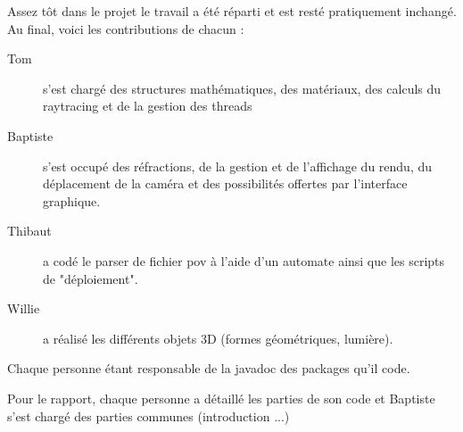 Assez tôt dans le projet le travail a été réparti et est resté pratiquement inchangé. Au final, voici les contributions de chacun :
\begin{description}
    \item [Tom] s'est chargé des structures mathématiques, des matériaux, des calculs du raytracing et de la gestion des threads
    \item [Baptiste] s'est occupé des réfractions, de la gestion et de l'affichage du rendu, du déplacement de la caméra et des possibilités offertes par l'interface graphique.
    \item [Thibaut] a codé le parser de fichier pov à l'aide d'un automate ainsi que les scripts de "déploiement".
    \item [Willie] a réalisé les différents objets 3D (formes géométriques, lumière).
\end{description}

Chaque personne étant responsable de la javadoc des packages qu'il code.

Pour le rapport, chaque personne a détaillé les parties de son code et Baptiste s'est chargé des parties communes (introduction ...)
